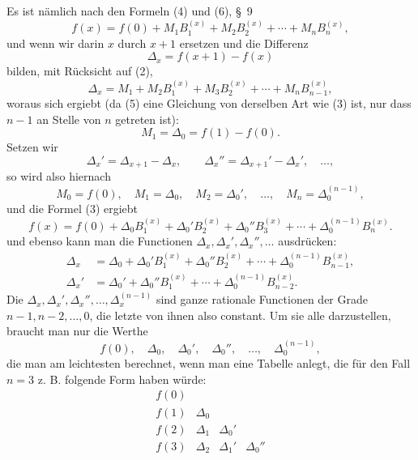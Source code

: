 \documentclass[11pt]{article}
\begin{document}
Es ist nämlich nach den Formeln (4) und (6), \S~9
\begin{equation}
 f(x)=f(0)+M_1B_1^{(x)}+M_2B_2^{(x)}+\cdots+M_nB_n^{(x)},
\tag{3}
\end{equation}
und wenn wir darin $x$ durch $x+1$ ersetzen und die Differenz
\begin{equation}
 \Delta_x=f(x+1)-f(x)
\tag{4}
\end{equation}
bilden, mit Rücksicht auf (2),
\begin{equation}
 \Delta_x=M_1+M_2B_1^{(x)}+M_3B_2^{(x)}+\cdots+M_nB_{n-1}^{(x)},
\tag{5}
\end{equation}
woraus sich ergiebt (da (5) eine Gleichung von derselben Art wie (3) ist, nur dass $n-1$ an Stelle von $n$ getreten ist):
\[
 M_1=\Delta_0=f(1)-f(0).
\]
Setzen wir
\begin{equation}
 \Delta_x'=\Delta_{x+1}-\Delta_x,
 \qquad \Delta_x''=\Delta_{x+1}'-\Delta_x',\quad\ldots,
\tag{6}
\end{equation}
so wird also hiernach
\[
 M_0=f(0),\quad M_1=\Delta_0,
 \quad M_2=\Delta_0',\quad\ldots,\quad M_n=\Delta_0^{(n-1)},
\]
und die Formel (3) ergiebt
\begin{equation}
 f(x)=f(0)+\Delta_0B_1^{(x)}+\Delta_0'B_2^{(x)}+\Delta_0''B_3^{(x)}+\cdots+\Delta_0^{(n-1)}B_n^{(x)}.
\tag{7}
\end{equation}
und ebenso kann man die Functionen $\Delta_x,\Delta_x',\Delta_x'',\ldots$ ausdrücken:
\begin{equation}
\begin{aligned}
 \Delta_x&=\Delta_0+\Delta_0'B_1^{(x)}+\Delta_0''B_2^{(x)}+\cdots+\Delta_0^{(n-1)}B_{n-1}^{(x)},\\
 \Delta_x'&=\Delta_0'+\Delta_0''B_1^{(x)}+\cdots+\Delta_0^{(n-1)}B_{n-2}^{(x)}.
\end{aligned}
\tag{8}
\end{equation}
Die $\Delta_x,\Delta_x',\Delta_x'',\ldots,\Delta_x^{(n-1)}$ sind ganze rationale Functionen der Grade $n-1,n-2,\ldots,0$, die letzte von ihnen also constant. Um sie alle darzustellen, braucht man nur die Werthe
\[
 f(0),\quad \Delta_0,\quad \Delta_0',\quad \Delta_0'',\quad\ldots,\quad \Delta_0^{(n-1)},
\]
die man am leichtesten berechnet, wenn man eine Tabelle anlegt, die für den Fall $n=3$ z. B. folgende Form haben würde:
\[
\begin{array}{cccc}
f(0) &&&\\
f(1)&\Delta_0&&\\
f(2)&\Delta_1&\Delta_0'&\\
f(3)&\Delta_2&\Delta_1'&\Delta_0''
\end{array}
\]
\end{document}
